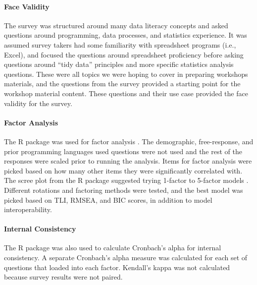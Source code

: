 \documentclass[020-persona\_validation.tex]{subfiles}
\begin{document}
            \paragraph{Face Validity}

                The survey was structured around many data literacy concepts and asked questions around
                programming, data processes, and statistics experience.
                It was assumed survey takers had some familiarity with spreadsheet programs (i.e., Excel),
                and focused the questions around spreadsheet proficiency before asking questions
                around ``tidy data'' principles and more specific statistics analysis questions.
                These were all topics we were hoping to cover in preparing workshops materials,
                and the questions from the survey provided a starting point for the workshop material content.
                These questions and their use case provided the face validity for the survey.

            \paragraph{Factor Analysis}

                The  R package was used for factor analysis
                \cite{revellePsychProceduresPsychological2021}.
                The demographic, free-response, and prior programming languages used questions
                were not used and the rest of the responses were scaled prior to running the analysis.
                Items for factor analysis were picked based on how many other items they were significantly correlated with.
                The scree plot from the R  package suggested trying 1-factor to 5-factor models
                \cite{raicheNFactorsParallelAnalysis2020}.
                Different rotations and factoring methods were tested,
                and the best model was picked based on
                TLI, RMSEA, and BIC scores, in addition to model interoperability.


            \paragraph{Internal Consistency}

                The  R package was also used to calculate Cronbach's alpha for internal consistency.
                A separate Cronbach's alpha measure was calculated for each set of questions that loaded into each factor.
                Kendall's kappa was not calculated because survey results were not paired.
\end{document}
